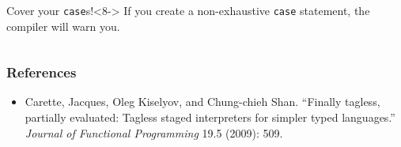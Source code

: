 \documentclass{beamer}
\begin{document}
\begin{frame}
\begin{columns}[T,onlytextwidth]
\begin{column}{.45\textwidth}
\begin{onlyenv}
\begin{minipage}{\textwidth}
                    \begin{alertblock}{\footnotesize Cover your \texttt{case}s!}<8->
                        {\footnotesize If you create a non-exhaustive \texttt{case} statement, the compiler will warn you.}
                    \end{alertblock}
                \end{minipage}
            \end{onlyenv}
        \end{column}
    \end{columns}
\end{frame}


\begin{frame}
\frametitle{References}
\begin{itemize}
 \item Carette, Jacques, Oleg Kiselyov, and Chung-chieh Shan. ``Finally tagless, partially evaluated: Tagless staged interpreters for simpler typed languages.'' \textit{Journal of Functional Programming} 19.5 (2009): 509.
\end{itemize}

\end{frame}
\end{document}
